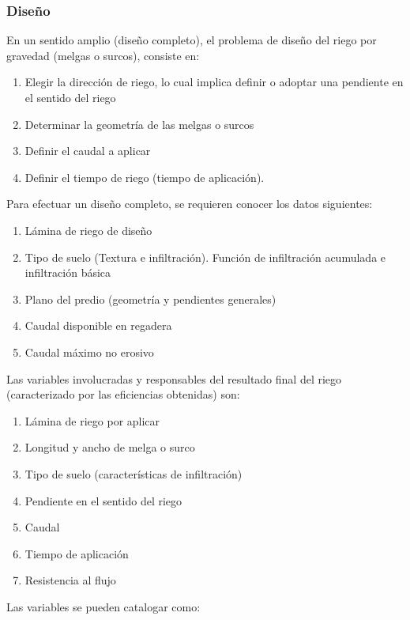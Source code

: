 \subsubsection{Diseño}
En un sentido amplio (diseño completo), el problema
de diseño del riego por gravedad (melgas o surcos),
consiste en:
\begin{enumerate}
    \item Elegir la dirección de riego, lo cual implica definir o adoptar una pendiente en el sentido del riego
    \item Determinar la geometría de las melgas o surcos
    \item Definir el caudal a aplicar
    \item Definir el tiempo de riego (tiempo de aplicación).
\end{enumerate}
Para efectuar un diseño completo, se requieren conocer los datos siguientes:
\begin{enumerate}
    \item Lámina de riego de diseño
    \item Tipo de suelo (Textura e infiltración). Función de infiltración acumulada e infiltración básica
    \item Plano del predio (geometría y pendientes generales)
    \item Caudal disponible en regadera
    \item Caudal máximo no erosivo
\end{enumerate}
Las variables involucradas y responsables del resultado final del riego (caracterizado por las eficiencias obtenidas) son:
\begin{enumerate}
    \item Lámina de riego por aplicar
    \item Longitud y ancho de melga o surco
    \item Tipo de suelo (características de infiltración)
    \item Pendiente en el sentido del riego
    \item Caudal
    \item Tiempo de aplicación
    \item Resistencia al flujo
\end{enumerate}
Las variables se pueden catalogar como:
